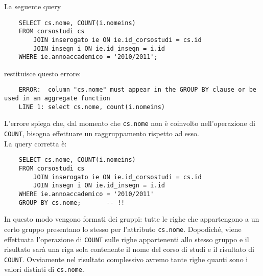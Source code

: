 \documentclass[12pt,a4paper]{book}
\begin{document}
	\begin{tcolorbox}[enhanced jigsaw, enhanced jigsaw, breakable,title=Esempio, title filled]
		La seguente query
	\begin{lstlisting}
	SELECT cs.nome, COUNT(i.nomeins)
	FROM corsostudi cs
		JOIN inserogato ie ON ie.id_corsostudi = cs.id
		JOIN insegn i ON ie.id_insegn = i.id
	WHERE ie.annoaccademico = '2010/2011';
	\end{lstlisting}
		restituisce questo errore:
	\begin{lstlisting}
	ERROR:  column "cs.nome" must appear in the GROUP BY clause or be used in an aggregate function
	LINE 1: select cs.nome, count(i.nomeins)
	\end{lstlisting}
		L'errore spiega che, dal momento che \texttt{cs.nome} non è coinvolto nell'operazione di \texttt{COUNT}, bisogna effettuare un raggruppamento rispetto ad esso.\\
		La query corretta è:
	\begin{lstlisting}
	SELECT cs.nome, COUNT(i.nomeins)
	FROM corsostudi cs
		JOIN inserogato ie ON ie.id_corsostudi = cs.id
		JOIN insegn i ON ie.id_insegn = i.id
	WHERE ie.annoaccademico = '2010/2011'
	GROUP BY cs.nome;	    -- !!
	\end{lstlisting}
	In questo modo vengono formati dei gruppi: tutte le righe che appartengono a un certo gruppo presentano lo stesso per l'attributo \texttt{cs.nome}. Dopodiché, viene effettuata l'operazione di \texttt{COUNT} sulle righe appartenenti allo stesso gruppo e il risultato sarà una riga sola contenente il nome del corso di studi e il risultato di \texttt{COUNT}. Ovviamente nel risultato complessivo avremo tante righe quanti sono i valori distinti di \texttt{cs.nome}.	
	\end{tcolorbox}
\end{document}
